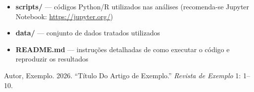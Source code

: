 \documentclass[sigconf]{webmedia}
\newlength{\cslhangindent}
\newenvironment{CSLReferences}[2] %
 {\begin{list}{}{%
  \setlength{\itemindent}{0pt}
  \setlength{\leftmargin}{0pt}
  \setlength{\parsep}{0pt}
  \ifodd #1
   \setlength{\leftmargin}{\cslhangindent}
   \setlength{\itemindent}{-1\cslhangindent}
  \fi
  \setlength{\itemsep}{#2\baselineskip}}}
 {\end{list}}
\providecommand{\tightlist}{%
  \setlength{\itemsep}{0pt}\setlength{\parskip}{0pt}}
\begin{document}
\begin{itemize}
\tightlist
\item
  \textbf{scripts/} --- códigos Python/R utilizados nas análises
  (recomenda-se Jupyter Notebook: \url{https://jupyter.org/})
\item
  \textbf{data/} --- conjunto de dados tratados utilizados
\item
  \textbf{README.md} --- instruções detalhadas de como executar o código
  e reproduzir os resultados
\end{itemize}

\label{refs}
\begin{CSLReferences}{1}{0}
Autor, Exemplo. 2026. {``Título Do Artigo de Exemplo.''} \emph{Revista
de Exemplo} 1: 1--10.

\end{CSLReferences}
\end{document}
